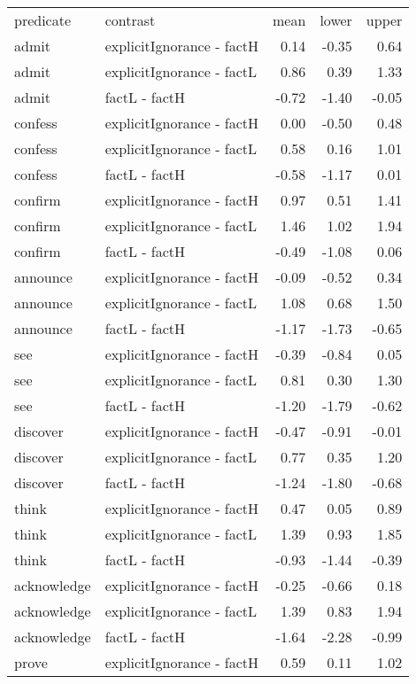 \begin{longtable}{llrrr}
 predicate & contrast & mean & lower & upper \\ 
 admit & explicitIgnorance - factH & 0.14 & -0.35 & 0.64 \\ 
  admit & explicitIgnorance - factL & 0.86 & 0.39 & 1.33 \\ 
  admit & factL - factH & -0.72 & -1.40 & -0.05 \\ 
  confess & explicitIgnorance - factH & 0.00 & -0.50 & 0.48 \\ 
  confess & explicitIgnorance - factL & 0.58 & 0.16 & 1.01 \\ 
  confess & factL - factH & -0.58 & -1.17 & 0.01 \\ 
  confirm & explicitIgnorance - factH & 0.97 & 0.51 & 1.41 \\ 
  confirm & explicitIgnorance - factL & 1.46 & 1.02 & 1.94 \\ 
  confirm & factL - factH & -0.49 & -1.08 & 0.06 \\ 
  announce & explicitIgnorance - factH & -0.09 & -0.52 & 0.34 \\ 
  announce & explicitIgnorance - factL & 1.08 & 0.68 & 1.50 \\ 
  announce & factL - factH & -1.17 & -1.73 & -0.65 \\ 
  see & explicitIgnorance - factH & -0.39 & -0.84 & 0.05 \\ 
  see & explicitIgnorance - factL & 0.81 & 0.30 & 1.30 \\ 
  see & factL - factH & -1.20 & -1.79 & -0.62 \\ 
  discover & explicitIgnorance - factH & -0.47 & -0.91 & -0.01 \\ 
  discover & explicitIgnorance - factL & 0.77 & 0.35 & 1.20 \\ 
  discover & factL - factH & -1.24 & -1.80 & -0.68 \\ 
  think & explicitIgnorance - factH & 0.47 & 0.05 & 0.89 \\ 
  think & explicitIgnorance - factL & 1.39 & 0.93 & 1.85 \\ 
  think & factL - factH & -0.93 & -1.44 & -0.39 \\ 
  acknowledge & explicitIgnorance - factH & -0.25 & -0.66 & 0.18 \\ 
  acknowledge & explicitIgnorance - factL & 1.39 & 0.83 & 1.94 \\ 
  acknowledge & factL - factH & -1.64 & -2.28 & -0.99 \\ 
  prove & explicitIgnorance - factH & 0.59 & 0.11 & 1.02 \\ 

\end{longtable}
